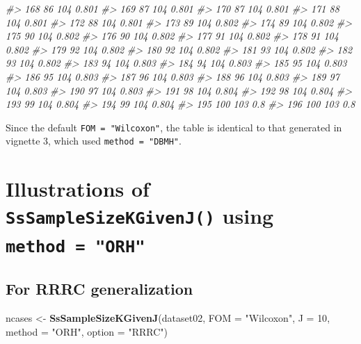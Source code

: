 \documentclass[]{book}
\newenvironment{Shaded}{\begin{snugshade}}{\end{snugshade}}
\newcommand{\CommentTok}[1]{\textcolor[rgb]{0.56,0.35,0.01}{\textit{#1}}}
\newcommand{\DataTypeTok}[1]{\textcolor[rgb]{0.13,0.29,0.53}{#1}}
\newcommand{\DecValTok}[1]{\textcolor[rgb]{0.00,0.00,0.81}{#1}}
\newcommand{\KeywordTok}[1]{\textcolor[rgb]{0.13,0.29,0.53}{\textbf{#1}}}
\newcommand{\NormalTok}[1]{#1}
\newcommand{\StringTok}[1]{\textcolor[rgb]{0.31,0.60,0.02}{#1}}
\begin{document}
\begin{Shaded}
\begin{Highlighting}[]
\CommentTok{#> 168         86      104 0.801}
\CommentTok{#> 169         87      104 0.801}
\CommentTok{#> 170         87      104 0.801}
\CommentTok{#> 171         88      104 0.801}
\CommentTok{#> 172         88      104 0.801}
\CommentTok{#> 173         89      104 0.802}
\CommentTok{#> 174         89      104 0.802}
\CommentTok{#> 175         90      104 0.802}
\CommentTok{#> 176         90      104 0.802}
\CommentTok{#> 177         91      104 0.802}
\CommentTok{#> 178         91      104 0.802}
\CommentTok{#> 179         92      104 0.802}
\CommentTok{#> 180         92      104 0.802}
\CommentTok{#> 181         93      104 0.802}
\CommentTok{#> 182         93      104 0.802}
\CommentTok{#> 183         94      104 0.803}
\CommentTok{#> 184         94      104 0.803}
\CommentTok{#> 185         95      104 0.803}
\CommentTok{#> 186         95      104 0.803}
\CommentTok{#> 187         96      104 0.803}
\CommentTok{#> 188         96      104 0.803}
\CommentTok{#> 189         97      104 0.803}
\CommentTok{#> 190         97      104 0.803}
\CommentTok{#> 191         98      104 0.804}
\CommentTok{#> 192         98      104 0.804}
\CommentTok{#> 193         99      104 0.804}
\CommentTok{#> 194         99      104 0.804}
\CommentTok{#> 195        100      103   0.8}
\CommentTok{#> 196        100      103   0.8}
\end{Highlighting}
\end{Shaded}

Since the default \texttt{FOM\ =\ "Wilcoxon"}, the table is identical to that generated in vignette 3, which used \texttt{method\ =\ "DBMH"}.

\hypertarget{illustrations-of-sssamplesizekgivenj-using-method-orh}{%
\section{\texorpdfstring{Illustrations of \texttt{SsSampleSizeKGivenJ()} using \texttt{method\ =\ "ORH"}}{Illustrations of SsSampleSizeKGivenJ() using method = "ORH"}}\label{illustrations-of-sssamplesizekgivenj-using-method-orh}}

\hypertarget{for-rrrc-generalization}{%
\subsection{For RRRC generalization}\label{for-rrrc-generalization}}

\begin{Shaded}
\begin{Highlighting}[]
\NormalTok{ncases <-}\StringTok{ }\KeywordTok{SsSampleSizeKGivenJ}\NormalTok{(dataset02, }\DataTypeTok{FOM =} \StringTok{"Wilcoxon"}\NormalTok{, }\DataTypeTok{J =} \DecValTok{10}\NormalTok{, }\DataTypeTok{method =} \StringTok{"ORH"}\NormalTok{, }\DataTypeTok{option =} \StringTok{"RRRC"}\NormalTok{)}
\end{Highlighting}
\end{Shaded}
\end{document}

